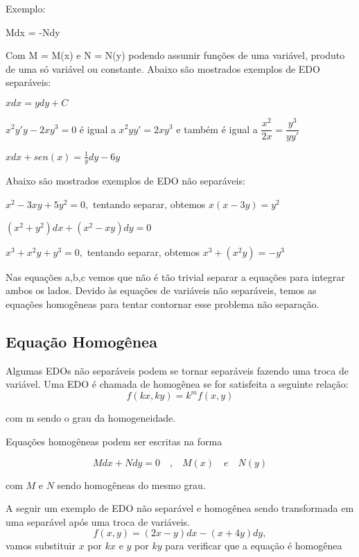 Exemplo: 
\begin{center}
 Mdx = -Ndy 
\end{center}

Com M = M(x) e N = N(y) podendo assumir funções de uma variável, produto de uma só variável ou constante. 
Abaixo são mostrados exemplos de EDO separáveis:


$
xdx = ydy + C 
$

 $ x^2y'y -2xy^3 = 0 $  é igual a $ x^2yy' = 2xy^3 $ e também é igual a  $ \dfrac{x^2}{2x} = \dfrac{y^3}{yy'} $

$ xdx + sen(x) = \frac{1}{y}dy - 6y $

Abaixo são mostrados exemplos de EDO não separáveis:

$ x^2 -3xy+5y^2 = 0, $ tentando separar, obtemos  $ x(x - 3y) = y^2 $ 
 

 $ (x^2 + y^2 )dx + (x^2 -xy)dy = 0 $


$ x^3 + x^2y +y^3  = 0, $ tentando separar, obtemos $ x^3 + (x^2y) = -y^3 $


Nas equações a,b,c vemos que não é tão trivial separar a equações para integrar ambos os lados. Devido às equações de variáveis não separáveis, temos as equações homogêneas para tentar contornar esse problema não separação.

\subsection[Equação Homogênea]{Equação Homogênea}
Algumas EDOs não separáveis podem se tornar separáveis fazendo uma troca de variável. Uma EDO é chamada de homogênea se for satisfeita a seguinte relação:
\begin{equation}
f(kx,ky) = k^m f(x,y) 
\end{equation}
\begin{center}
com m sendo o grau da homogeneidade.
\end{center}


Equações homogêneas podem ser escritas na forma 

\begin{equation}
Mdx + Ndy = 0  \quad \textrm{,} \quad M(x)\quad  e  \quad N(y)
\end{equation}
\begin{center}
com $M$ e $N$ sendo homogêneas do  mesmo grau.
\end{center}

A seguir um exemplo de EDO não separável e homogênea sendo transformada em uma separável após uma troca de variáveis.
\begin{equation}
f(x,y) = (2x - y )dx - (x + 4y)dy, 
\end{equation}
vamos substituir $x$ por $kx$ e $y$ por $ky$ para verificar que a equação é homogênea


